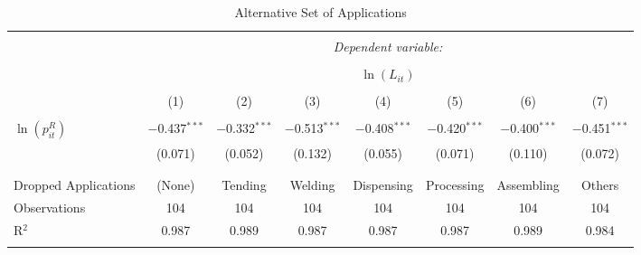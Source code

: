 
\begin{table}[!t] \centering 
  \caption{Alternative Set of Applications} 
  \label{industry_alternative_set_of_applications_exhaustive_rf} 
\begin{tabular}{@{\extracolsep{5pt}}lccccccc} 
\\[-1.8ex]\hline 
\hline \\[-1.8ex] 
 & \multicolumn{7}{c}{\textit{Dependent variable:}} \\ 
\cline{2-8} 
\\[-1.8ex] & \multicolumn{7}{c}{$\ln(L_{it})$} \\ 
\\[-1.8ex] & (1) & (2) & (3) & (4) & (5) & (6) & (7)\\ 
\hline \\[-1.8ex] 
 $\ln(p^{R}_{it})$ & $-$0.437$^{***}$ & $-$0.332$^{***}$ & $-$0.513$^{***}$ & $-$0.408$^{***}$ & $-$0.420$^{***}$ & $-$0.400$^{***}$ & $-$0.451$^{***}$ \\ 
  & (0.071) & (0.052) & (0.132) & (0.055) & (0.071) & (0.110) & (0.072) \\ 
  & & & & & & & \\ 
\hline \\[-1.8ex] 
Dropped Applications & (None) & Tending & Welding & Dispensing & Processing & Assembling & Others \\ 
Observations & 104 & 104 & 104 & 104 & 104 & 104 & 104 \\ 
R$^{2}$ & 0.987 & 0.989 & 0.987 & 0.987 & 0.987 & 0.989 & 0.984 \\ 
\hline 
\hline \\[-1.8ex] 
\end{tabular} 
\end{table} 
